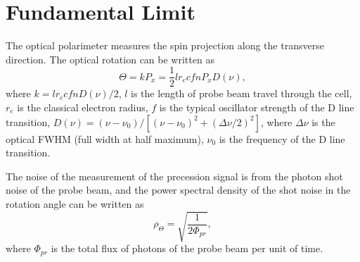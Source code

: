 \documentclass[prx,twocolumn,10pt,nofootinbib]{revtex4-1}
\begin{document}
\section{Fundamental Limit}
The optical polarimeter measures the spin projection along the transverse direction. The optical rotation can be written as \cite{savukov2005tunable}
\begin{equation}
	\Theta = k P_x= \frac{1}{2} l r_e c f n P_x D(\nu),
	\label{eq:optical_rotation} 
\end{equation}
where $k=l r_e c f n D(\nu)/2$, $l$ is the length of probe beam travel through the cell, $r_e$ is the classical electron radius, $f$ is the typical oscillator strength of the D line transition, $D(\nu) = (\nu - \nu_0)/[(\nu-\nu_0)^2+(\Delta \nu /2)^2]$, where $\Delta \nu$ is the optical FWHM (full width at half maximum), $\nu_0$ is the frequency of the D line transition. 

The noise of the measurement of the precession signal is from the photon shot noise of the probe beam, and the power spectral density of the shot noise in the rotation angle can be written as \cite{seltzer2008developments}
\begin{equation}
	\rho_\Theta = \sqrt{\frac{1}{2 \Phi_{pr}}},
	\label{eq:psn}
\end{equation}
where $\Phi_{pr}$ is the total flux of photons of the probe beam per unit of time.
\end{document}
